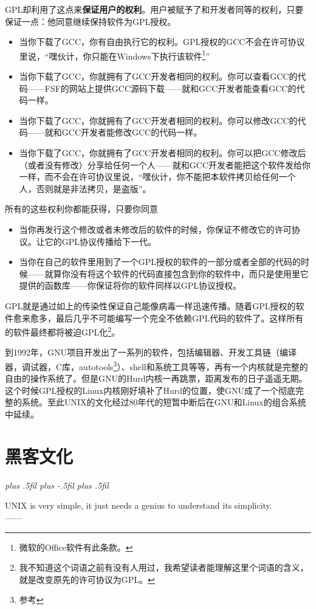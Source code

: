 \documentclass[amstex]{ctexbook}
\newcommand{\RTLpar}{%
  \leftskip=0pt plus .5fil%
  \rightskip=0pt plus -.5fil%
  \parfillskip=0pt plus .5fil%
}
\newenvironment{quotes}[2][0.55]{\pushQED{#2}%
\begin{flushright}%
\begin{minipage}{#1\textwidth}\begin{flushright}\noindent\it\RTLpar}{%
 \\------\popQED{}\end{flushright}\end{minipage}\end{flushright}}%
\begin{document}
GPL却利用了这点来\textbf{保证用户的权利}。用户被赋予了和开发者同等的权利，只要保证一点：他同意继续保持软件为GPL授权。

\begin{itemize}
\item 当你下载了GCC，你有自由执行它的权利。GPL授权的GCC不会在许可协议里说，“嘿伙计，你只能在Windows下执行该软件\footnote{微软的Office软件有此条款。}”

\item 当你下载了GCC，你就拥有了GCC开发者相同的权利。你可以查看GCC的代码------FSF的网站上提供GCC源码下载------就和GCC开发者能查看GCC的代码一样。

\item  当你下载了GCC，你就拥有了GCC开发者相同的权利。你可以修改GCC的代码------就和GCC开发者能修改GCC的代码一样。

\item  当你下载了GCC，你就拥有了GCC开发者相同的权利。你可以把GCC修改后（或者没有修改）分享给任何一个人------就和GCC开发者能把这个软件发给你一样，而不会在许可协议里说，“嘿伙计，你不能把本软件拷贝给任何一个人，否则就是非法拷贝，是盗版”。

\end{itemize}

所有的这些权利你都能获得，只要你同意
\begin{itemize}
\item 当你再发行这个修改或者未修改后的软件的时候，你保证不修改它的许可协议。让它的GPL协议传播给下一代。
\item 当你在自己的软件里用到了一个GPL授权的软件的一部分或者全部的代码的时候------就算你没有将这个软件的代码直接包含到你的软件中，而只是使用里它提供的函数库------你保证将你的软件同样以GPL协议授权。
\end{itemize}

GPL就是通过如上的传染性保证自己能像病毒一样迅速传播。随着GPL授权的软件愈来愈多，最后几乎不可能编写一个完全不依赖GPL代码的软件了。这样所有的软件最终都将被迫GPL化\footnote{我不知道这个词语之前有没有人用过，我希望读者能理解这里个词语的含义，就是改变原先的许可协议为GPL。}。

到1992年，GNU项目开发出了一系列的软件，包括编辑器、开发工具链（编译器，调试器，C库，autotools\footnote{参考}）、shell和系统工具等等，再有一个内核就是完整的自由的操作系统了。但是GNU的Hurd内核一再跳票，距离发布的日子遥遥无期。这个时候GPL授权的Linux内核刚好填补了Hurd的位置，使GNU成了一个彻底完整的系统。至此UNIX的文化经过80年代的短暂中断后在GNU和Linux的组合系统中延续。

\chapter{黑客文化}
\begin{quotes}{Dennis Ritchie}
UNIX is very simple, it just needs a genius to understand its simplicity.
\end{quotes}
\end{document}
